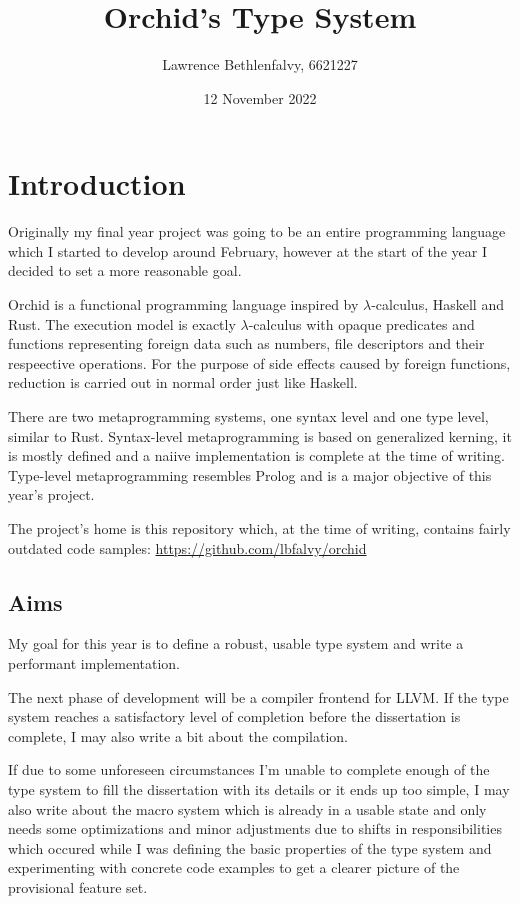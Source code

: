 \documentclass{article}
\title{Orchid's Type System}
\author{Lawrence Bethlenfalvy, 6621227}
\date{12 November 2022}
\begin{document}
\maketitle


\section{Introduction}

Originally my final year project was going to be an entire programming language which I started to
develop around February, however at the start of the year I decided to set a more reasonable goal.

Orchid is a functional programming language inspired by $\lambda$-calculus, Haskell and Rust. The
execution model is exactly $\lambda$-calculus with opaque predicates and functions representing
foreign data such as numbers, file descriptors and their respeective operations. For the purpose of
side effects caused by foreign functions, reduction is carried out in normal order just like
Haskell.

There are two metaprogramming systems, one syntax level and one type level, similar to Rust.
Syntax-level metaprogramming is based on generalized kerning, it is mostly defined and a naiive
implementation is complete at the time of writing. Type-level metaprogramming resembles Prolog and
is a major objective of this year's project.

The project's home is this repository which, at the time of writing, contains fairly outdated code
samples: \url{https://github.com/lbfalvy/orchid}

\subsection{Aims}

My goal for this year is to define a robust, usable type system and write a performant
implementation.

The next phase of development will be a compiler frontend for LLVM. If the type system reaches a
satisfactory level of completion before the dissertation is complete, I may also write a bit about
the compilation.

If due to some unforeseen circumstances I'm unable to complete enough of the type system to fill
the dissertation with its details or it ends up too simple, I may also write about the macro system
which is already in a usable state and only needs some optimizations and minor adjustments
due to shifts in responsibilities which occured while I was defining the basic properties of the
type system and experimenting with concrete code examples to get a clearer picture of the
provisional feature set.
\end{document}
